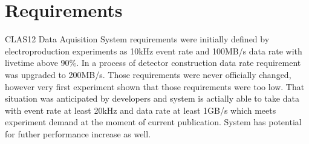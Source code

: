 \section{Requirements}

CLAS12 Data Aquisition System requirements were initially defined by electroproduction experiments as 10kHz event rate and 100MB/s data rate with livetime above 90\%. In a process of detector construction data rate requirement was upgraded to 200MB/s. Those requirements were never officially changed, however very first experiment shown that those requirements were too low. That situation was anticipated by developers and system is actially able to take data with event rate at least 20kHz and data rate at least 1GB/s which meets experiment demand at the moment of current publication. System has potential for futher performance increase as well.

